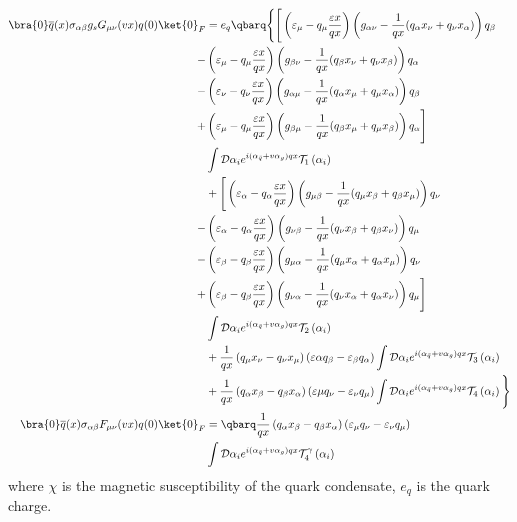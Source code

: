 \begin{align*}
        \bra{0}\overline{q}(x)\sigma_{\alpha\beta}g_s G_{\mu\nu}(vx)q(0)\ket{0}_F &= e_q\qbarq\Bigg\{\Bigg[\left(\varepsilon_\mu - q_\mu\dfrac{\varepsilon x}{qx}\right)\left(g_{\alpha\nu}-\dfrac{1}{qx}(q_\alpha x_\nu + q_\nu x_\alpha)\right)q_\beta\\
        -&\left(\varepsilon_\mu - q_\mu\dfrac{\varepsilon x}{qx}\right)\left(g_{\beta\nu}-\dfrac{1}{qx}(q_\beta x_\nu + q_\nu x_\beta)\right)q_\alpha\\
        -&\left(\varepsilon_\nu - q_\nu\dfrac{\varepsilon x}{qx}\right)\left(g_{\alpha\mu}-\dfrac{1}{qx}(q_\alpha x_\mu + q_\mu x_\alpha)\right)q_\beta\\
        +&\left(\varepsilon_\mu - q_\mu\dfrac{\varepsilon x}{qx}\right)\left(g_{\beta\mu}-\dfrac{1}{qx}(q_\beta x_\mu + q_\mu x_\beta)\right)q_\alpha\Bigg]\\
        &\int \mathcal{D}\alpha_ie^{i(\alpha_{\Bar{q}}+v\alpha_g)qx}\mathcal{T}_1\left(\alpha_i\right)\\
        &+\Bigg[\left(\varepsilon_\alpha - q_\alpha\dfrac{\varepsilon x}{qx}\right)\left(g_{\mu\beta}-\dfrac{1}{qx}(q_\mu x_\beta + q_\beta x_\mu)\right)q_\nu\\
        -&\left(\varepsilon_\alpha - q_\alpha\dfrac{\varepsilon x}{qx}\right)\left(g_{\nu\beta}-\dfrac{1}{qx}(q_\nu x_\beta + q_\beta x_\nu)\right)q_\mu\\
        -&\left(\varepsilon_\beta - q_\beta\dfrac{\varepsilon x}{qx}\right)\left(g_{\mu\alpha}-\dfrac{1}{qx}(q_\mu x_\alpha + q_\alpha x_\mu)\right)q_\nu\\
        +&\left(\varepsilon_\beta - q_\beta\dfrac{\varepsilon x}{qx}\right)\left(g_{\nu\alpha}-\dfrac{1}{qx}(q_\nu x_\alpha + q_\alpha x_\nu)\right)q_\mu\Bigg]\\
        &\int \mathcal{D}\alpha_ie^{i(\alpha_{\Bar{q}}+v\alpha_g)qx}\mathcal{T}_2\left(\alpha_i\right)\\
        &+\dfrac{1}{qx}\left(q_\mu x_\nu - q_\nu x_\mu\right)\left(\varepsilon\alpha q_\beta - \varepsilon_\beta q_\alpha\right)\int\mathcal{D}\alpha_ie^{i(\alpha_{\Bar{q}}+v\alpha_g)qx}\mathcal{T}_3\left(\alpha_i\right)\\
        &+\dfrac{1}{qx}\left(q_\alpha x_\beta - q_\beta x_\alpha\right)\left(\varepsilon\mu q_\nu - \varepsilon_\nu q_\mu\right)\int\mathcal{D}\alpha_ie^{i(\alpha_{\Bar{q}}+v\alpha_g)qx}\mathcal{T}_4\left(\alpha_i\right)\Bigg\}\\
        \bra{0}\overline{q}(x)\sigma_{\alpha\beta} F_{\mu\nu}(vx)q(0)\ket{0}_F &=\qbarq\dfrac{1}{qx}\left(q_\alpha x_\beta - q_\beta x_\alpha\right)\left(\varepsilon_\mu q_\nu - \varepsilon_\nu q_\mu\right)\\
        &\int\mathcal{D}\alpha_ie^{i(\alpha_{\Bar{q}}+v\alpha_g)qx}\mathcal{T}^\gamma_4\left(\alpha_i\right)
    \label{photondas}
\end{align*}
where $\chi$ is the magnetic susceptibility of the quark condensate, $e_q$ is the quark charge.